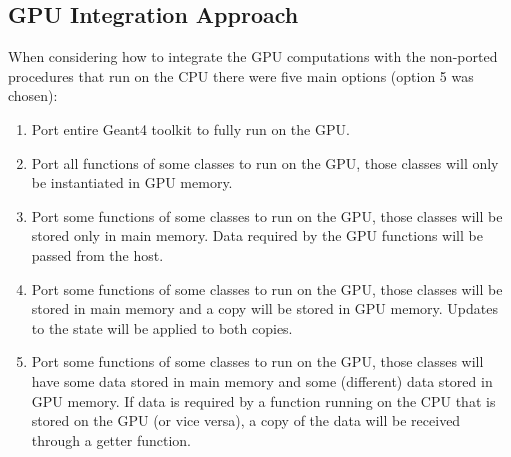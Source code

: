 \documentclass[12pt]{article}
\begin{document}
\subsection{GPU Integration Approach}\label{Sec_IntegrationApproach}
When considering how to integrate the GPU computations with the non-ported procedures that run on the CPU there were five main options (option 5 was chosen):
\begin{enumerate}
\item Port entire Geant4 toolkit to fully run on the GPU.
\item Port all functions of some classes to run on the GPU, those classes will only be instantiated in GPU memory.
\item Port some functions of some classes to run on the GPU, those classes will be stored only in main memory. Data required by the GPU functions will be passed from the host.
\item Port some functions of some classes to run on the GPU, those classes will be stored in main memory and a copy will be stored in GPU memory. Updates to the state will be applied to both copies.
\item Port some functions of some classes to run on the GPU, those classes will have some data stored in main memory and some (different) data stored in GPU memory. If data is required by a function running on the CPU that is stored on the GPU (or vice versa), a copy of the data will be received through a getter function.
\end{enumerate}
\end{document}
